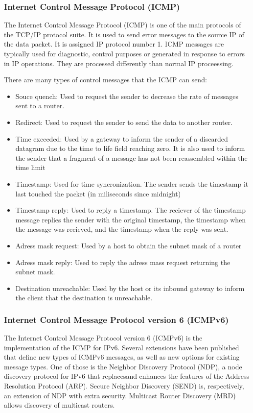 \subsubsection*{Internet Control Message Protocol (ICMP)\cite{ICMP}}
The Internet Control Message Protocol (ICMP) is one of the main protocols of the TCP/IP protocol suite. It is used to send error messages to the source IP of the data packet. It is assigned IP protocol number 1. ICMP messages are typically used for diagnostic, control purposes or generated in response to errors in IP operations. They are processed differently than normal IP proceessing.

There are many types of control messages that the ICMP can send:

\begin{itemize}
\item Souce quench: Used to request the sender to decrease the rate of messages sent to a router.
\item Redirect: Used to request the sender to send the data to another router.
\item Time exceeded: Used by a gateway to inform the sender of a discarded datagram due to the time to life field reaching zero. It is also used to inform the sender that a fragment of a message has not been reassembled within the time limit
\item Timestamp: Used for time syncronization. The sender sends the timestamp it last touched the packet (in miliseconds since midnight)
\item Timestamp reply: Used to reply a timestamp. The reciever of the timestamp message replies the sender with the original timestamp, the timestamp when the message was recieved, and the timestamp when the reply was sent.
\item Adress mask request: Used by a host to obtain the subnet mask of a router
\item Adress mask reply: Used to reply the adress mass request returning the subnet mask.
\item Destination unreachable: Used by the host or its inbound gateway to inform the client that the destination is unreachable.
\end{itemize}

\subsubsection*{Internet Control Message Protocol version 6 (ICMPv6)\cite{ICMPv6}}
The Internet Control Message Protocol version 6 (ICMPv6) is the implementation of the ICMP for IPv6. Several extensions have been published that define new types of ICMPv6 messages, as well as new options for existing message types. One of those is the Neighbor Discovery Protocol (NDP), a node discovery protocol for IPv6 that replacesand enhances the features of the Address Resolution Protocol (ARP). Secure Neighbor Discovery (SEND) is, respectively, an extension of NDP with extra security. Multicast Router Discovery (MRD) allows discovery of multicast routers.

